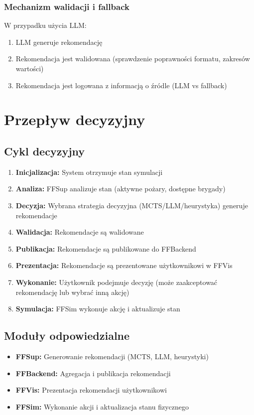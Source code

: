 \documentclass[11pt,a4paper]{article}
\begin{document}
\subsubsection{Mechanizm walidacji i fallback}

W przypadku użycia LLM:
\begin{enumerate}
    \item LLM generuje rekomendację
    \item Rekomendacja jest walidowana (sprawdzenie poprawności formatu, zakresów wartości)
    \item Rekomendacja jest logowana z informacją o źródle (LLM vs fallback)
\end{enumerate}

\section{Przepływ decyzyjny}

\subsection{Cykl decyzyjny}

\begin{enumerate}
    \item \textbf{Inicjalizacja:} System otrzymuje stan symulacji
    \item \textbf{Analiza:} FFSup analizuje stan (aktywne pożary, dostępne brygady)
    \item \textbf{Decyzja:} Wybrana strategia decyzyjna (MCTS/LLM/heurystyka) generuje rekomendacje
    \item \textbf{Walidacja:} Rekomendacje są walidowane
    \item \textbf{Publikacja:} Rekomendacje są publikowane do FFBackend
    \item \textbf{Prezentacja:} Rekomendacje są prezentowane użytkownikowi w FFVis
    \item \textbf{Wykonanie:} Użytkownik podejmuje decyzję (może zaakceptować rekomendację lub wybrać inną akcję)
    \item \textbf{Symulacja:} FFSim wykonuje akcję i aktualizuje stan
\end{enumerate}

\subsection{Moduły odpowiedzialne}

\begin{itemize}
    \item \textbf{FFSup:} Generowanie rekomendacji (MCTS, LLM, heurystyki)
    \item \textbf{FFBackend:} Agregacja i publikacja rekomendacji
    \item \textbf{FFVis:} Prezentacja rekomendacji użytkownikowi
    \item \textbf{FFSim:} Wykonanie akcji i aktualizacja stanu fizycznego
\end{itemize}
\end{document}

